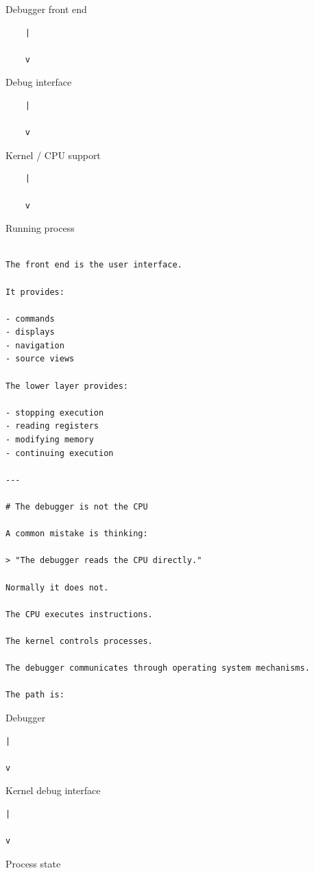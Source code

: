 \documentclass[
  oneside,
  openany]{book}
\begin{document}
Debugger front end

\begin{verbatim}
    |

    v
\end{verbatim}

Debug interface

\begin{verbatim}
    |

    v
\end{verbatim}

Kernel / CPU support

\begin{verbatim}
    |

    v
\end{verbatim}

Running process

\begin{verbatim}

The front end is the user interface.

It provides:

- commands
- displays
- navigation
- source views

The lower layer provides:

- stopping execution
- reading registers
- modifying memory
- continuing execution

---

# The debugger is not the CPU

A common mistake is thinking:

> "The debugger reads the CPU directly."

Normally it does not.

The CPU executes instructions.

The kernel controls processes.

The debugger communicates through operating system mechanisms.

The path is:
\end{verbatim}

Debugger

\begin{verbatim}
|

v
\end{verbatim}

Kernel debug interface

\begin{verbatim}
|

v
\end{verbatim}

Process state
\end{document}
